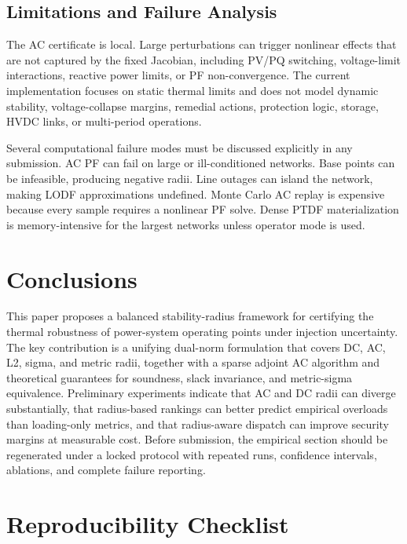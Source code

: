 \documentclass[energies,article,submit,pdftex,moreauthors]{Definitions/mdpi}
\begin{document}
\subsection{Limitations and Failure Analysis}

The AC certificate is local. Large perturbations can trigger nonlinear effects that are not captured by the fixed Jacobian, including PV/PQ switching, voltage-limit interactions, reactive power limits, or PF non-convergence. The current implementation focuses on static thermal limits and does not model dynamic stability, voltage-collapse margins, remedial actions, protection logic, storage, HVDC links, or multi-period operations.

Several computational failure modes must be discussed explicitly in any submission. AC PF can fail on large or ill-conditioned networks. Base points can be infeasible, producing negative radii. Line outages can island the network, making LODF approximations undefined. Monte Carlo AC replay is expensive because every sample requires a nonlinear PF solve. Dense PTDF materialization is memory-intensive for the largest networks unless operator mode is used.

\section{Conclusions}

This paper proposes a balanced stability-radius framework for certifying the thermal robustness of power-system operating points under injection uncertainty. The key contribution is a unifying dual-norm formulation that covers DC, AC, L2, sigma, and metric radii, together with a sparse adjoint AC algorithm and theoretical guarantees for soundness, slack invariance, and metric-sigma equivalence. Preliminary experiments indicate that AC and DC radii can diverge substantially, that radius-based rankings can better predict empirical overloads than loading-only metrics, and that radius-aware dispatch can improve security margins at measurable cost. Before submission, the empirical section should be regenerated under a locked protocol with repeated runs, confidence intervals, ablations, and complete failure reporting.

\section*{Reproducibility Checklist}
\end{document}
